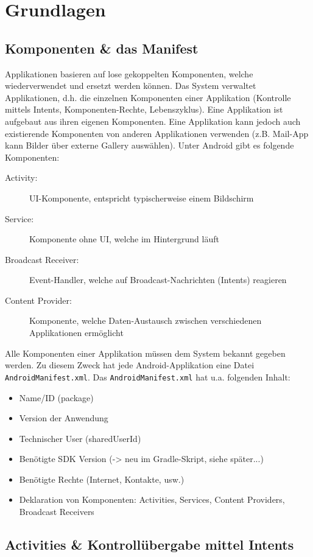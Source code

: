 \chapter{Grundlagen}

\section{Komponenten \& das Manifest}

Applikationen basieren auf lose gekoppelten Komponenten, welche wiederverwendet und ersetzt werden können. Das System verwaltet Applikationen, d.h. die einzelnen Komponenten einer Applikation (Kontrolle mittels Intents, Komponenten-Rechte, Lebenszyklus). Eine Applikation ist aufgebaut aus ihren eigenen Komponenten. Eine Applikation kann jedoch auch existierende Komponenten von anderen Applikationen verwenden (z.B. Mail-App kann Bilder über externe Gallery auswählen). Unter Android gibt es folgende Komponenten:
\begin{description}
	\item[Activity:] UI-Komponente, entspricht typischerweise einem Bildschirm
	\item[Service:] Komponente ohne UI, welche im Hintergrund läuft
	\item[Broadcast Receiver:] Event-Handler, welche auf Broadcast-Nachrichten (Intents) reagieren
	\item[Content Provider:] Komponente, welche Daten-Austausch zwischen verschiedenen Applikationen ermöglicht
\end{description}
Alle Komponenten einer Applikation müssen dem System bekannt gegeben werden. Zu diesem Zweck hat jede Android-Applikation eine
Datei \texttt{AndroidManifest.xml}. Das \texttt{AndroidManifest.xml} hat u.a. folgenden Inhalt:
\begin{itemize}
	\item Name/ID (package)
	\item Version der Anwendung
	\item Technischer User (sharedUserId)
	\item Benötigte SDK Version (-> neu im Gradle-Skript, siehe später...)
	\item Benötigte Rechte (Internet, Kontakte, usw.)
	\item Deklaration von Komponenten: Activities, Services, Content Providers, Broadcast Receivers
\end{itemize}

\section{Activities \& Kontrollübergabe mittel Intents}

